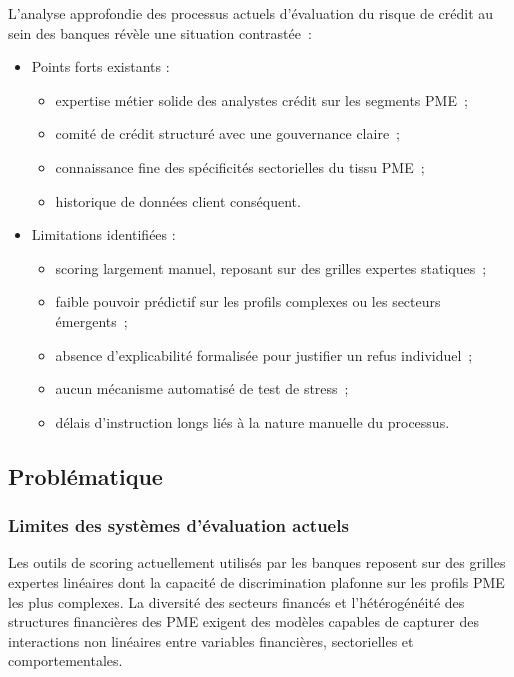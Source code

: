 \documentclass[a4paper,12pt,oneside]{report}
\begin{document}
L'analyse approfondie des processus actuels d'évaluation du risque de crédit au sein des banques
révèle une situation contrastée~:

\begin{itemize}
  \item Points forts existants :
  \begin{itemize}
    \item expertise métier solide des analystes crédit sur les segments PME~;
    \item comité de crédit structuré avec une gouvernance claire~;
    \item connaissance fine des spécificités sectorielles du tissu PME~;
    \item historique de données client conséquent.
  \end{itemize}
  \item Limitations identifiées :
  \begin{itemize}
    \item scoring largement manuel, reposant sur des grilles expertes statiques~;
    \item faible pouvoir prédictif sur les profils complexes ou les secteurs émergents~;
    \item absence d'explicabilité formalisée pour justifier un refus individuel~;
    \item aucun mécanisme automatisé de test de stress~;
    \item délais d'instruction longs liés à la nature manuelle du processus.
  \end{itemize}
\end{itemize}

\subsection{Problématique}

\subsubsection{Limites des systèmes d'évaluation actuels}

Les outils de scoring actuellement utilisés par les banques reposent sur des grilles expertes
linéaires dont la capacité de discrimination plafonne sur les profils PME les plus
complexes. La diversité des secteurs financés et l'hétérogénéité des structures financières
des PME exigent des modèles capables de capturer des interactions non linéaires
entre variables financières, sectorielles et comportementales.
\end{document}
